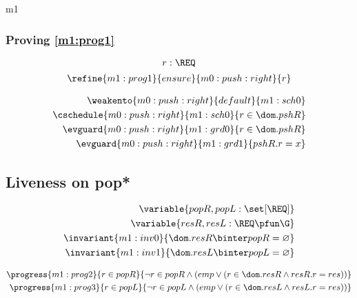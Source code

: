 \documentclass[12pt]{amsart}
\begin{document}
\begin{machine}{m1}
\subsubsection{Proving \ref{m1:prog1}}
\[ \indices{m0:push:right}{ r : \REQ } \]
\begin{align*}
\refine{m1:prog1}{ensure}{m0:push:right}{ \index{r}{r} }
\end{align*}

\begin{align*}
\weakento{m0:push:right}{default}{m1:sch0}
\\ \cschedule{m0:push:right}{m1:sch0}{ r \in \dom.pshR }
\\ \evguard{m0:push:right}{m1:grd0}{ r \in \dom.pshR }
\\ \evguard{m0:push:right}{m1:grd1}{ pshR.r = x }
\end{align*}

\subsection{Liveness on pop*}

\begin{align*}
\variable{ popR, popL : \set [\REQ]}
\\ \variable{ resR, resL : \REQ \pfun \G }
\\ \invariant{m1:inv0}{ \dom.resR \binter popR = \emptyset }
\\ \invariant{m1:inv1}{ \dom.resL \binter popL = \emptyset }
\end{align*}

\begin{align*}
\progress{m1:prog2}
	{ r \in popR }
	{ \neg r \in popR \land (emp \lor (r \in \dom.resR \land resR.r = res))  }
\\ \progress{m1:prog3}
	{ r \in popL }
	{ \neg r \in popL \land (emp \lor (r \in \dom.resL \land resL.r = res))  }
\end{align*}


\end{machine}
\end{document}
